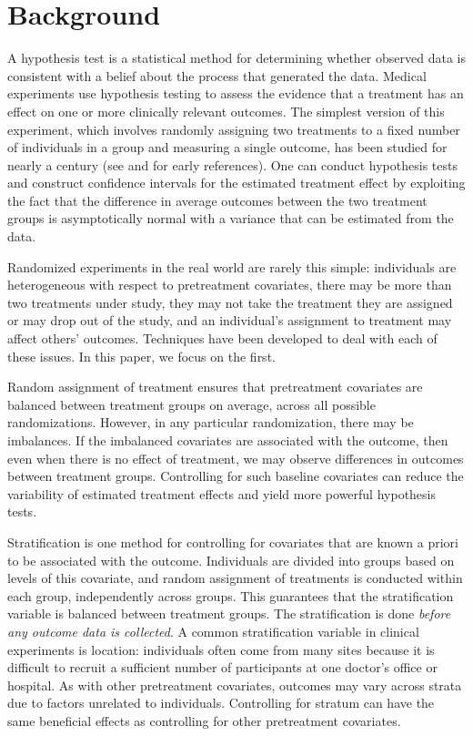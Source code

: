 \documentclass[11pt]{article}
\newcommand{\todo}[1]{{\color{red}{TO DO: \sc #1}}}
\begin{document}
\section{Background}
A hypothesis test is a statistical method for determining whether observed data is consistent with a belief about the process that generated the data.
Medical experiments use hypothesis testing to assess the evidence that a treatment has an effect on one or more clinically relevant outcomes.
The simplest version of this experiment, which involves randomly assigning two treatments to a fixed number of individuals in a group and measuring a single outcome, has been studied for nearly a century (see \citet{fisher_design_1935} and \citet{neyman_application_1923} for early references).
One can conduct hypothesis tests and construct confidence intervals for the estimated treatment effect
by exploiting the fact that the difference in average outcomes between the two treatment groups is asymptotically normal with a variance that can be estimated from the data.

Randomized experiments in the real world are rarely this simple:
individuals are heterogeneous with respect to pretreatment covariates,
there may be more than two treatments under study,
they may not take the treatment they are assigned or may drop out of the study,
and an individual's assignment to treatment may affect others' outcomes.
Techniques have been developed to deal with each of these issues.
In this paper, we focus on the first.

Random assignment of treatment ensures that pretreatment covariates are balanced between treatment groups on average, across all possible randomizations.
However, in any particular randomization, there may be imbalances.
If the imbalanced covariates are associated with the outcome, then even when there is no effect of treatment, we may observe differences in outcomes between treatment groups.
Controlling for such baseline covariates can reduce the variability of estimated treatment effects and yield more powerful hypothesis tests. \todo{cite}

Stratification is one method for controlling for covariates that are known a priori to be associated with the outcome.
Individuals are divided into groups based on levels of this covariate, and random assignment of treatments is conducted within each group, independently across groups.
This guarantees that the stratification variable is balanced between treatment groups.
The stratification is done \textit{before any outcome data is collected}.
A common stratification variable in clinical experiments is location:
individuals often come from many sites because it is difficult to recruit a sufficient number of participants at one doctor's office or hospital.
As with other pretreatment covariates, outcomes may vary across strata due to factors unrelated to individuals.
Controlling for stratum can have the same beneficial effects as controlling for other pretreatment covariates.
\end{document}
